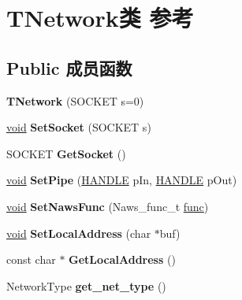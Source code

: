 \hypertarget{class_t_network}{}\section{T\+Network类 参考}
\label{class_t_network}
\subsection*{Public 成员函数}
\begin{DoxyCompactItemize}
\item 
\mbox{\label{class_t_network_a1d32924a38c04b5d0c6b0fd4e90aedfe}} 
{\bfseries T\+Network} (S\+O\+C\+K\+ET s=0)
\item 
\mbox{\label{class_t_network_a1e9ae344e25f0aba755a7dc50e00cff2}} 
\hyperlink{interfacevoid}{void} {\bfseries Set\+Socket} (S\+O\+C\+K\+ET s)
\item 
\mbox{\label{class_t_network_a44958db15beaf857e2c1a53073cfc078}} 
S\+O\+C\+K\+ET {\bfseries Get\+Socket} ()
\item 
\mbox{\label{class_t_network_aab3f2e918e723e4742726417fe3804de}} 
\hyperlink{interfacevoid}{void} {\bfseries Set\+Pipe} (\hyperlink{interfacevoid}{H\+A\+N\+D\+LE} p\+In, \hyperlink{interfacevoid}{H\+A\+N\+D\+LE} p\+Out)
\item 
\mbox{\label{class_t_network_adb8e9e6ecfb9553fc7ee2ecb749c2a48}} 
\hyperlink{interfacevoid}{void} {\bfseries Set\+Naws\+Func} (Naws\+\_\+func\+\_\+t \hyperlink{interfacevoid}{func})
\item 
\mbox{\label{class_t_network_a2d5856d353d7a9c9db9b1e6a7f02426a}} 
\hyperlink{interfacevoid}{void} {\bfseries Set\+Local\+Address} (char $\ast$buf)
\item 
\mbox{\label{class_t_network_af7eba5ed3883dbb2d3340534b8af8c8e}} 
const char $\ast$ {\bfseries Get\+Local\+Address} ()
\item 
\mbox{\label{class_t_network_a70237f24324981f26771b334d0a6a48f}} 
Network\+Type {\bfseries get\+\_\+net\+\_\+type} ()
\item 

\end{DoxyCompactItemize}
